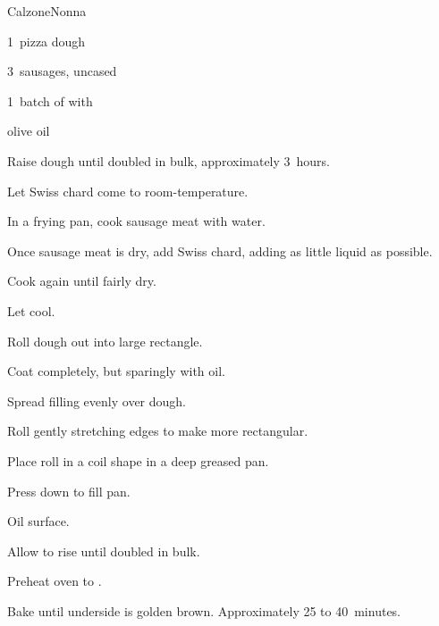 \begin{recipe}{Calzone}{Nonna}{}

\begin{ingredients}
\item 1~pizza dough
\item 3~sausages, uncased
\item 1~batch of  with 
\item olive oil
\end{ingredients}

\begin{directions}
\item Raise dough until doubled in bulk, approximately 3~hours.
\item Let Swiss chard come to room-temperature.
\item In a frying pan, cook sausage meat with \C{\quarter} water.
\item Once sausage meat is dry, add Swiss chard, adding as little liquid as possible.
\item Cook again until fairly dry.
\item Let cool.
\item Roll dough out into large rectangle.
\item Coat completely, but sparingly with oil.
\item Spread filling evenly over dough.
\item Roll gently stretching edges to make more rectangular.
\item Place roll in a coil shape in a deep greased pan.
\item Press down to fill pan.
\item Oil surface.
\item Allow to rise until doubled in bulk.
\item Preheat oven to .
\item Bake until underside is golden brown. Approximately 25 to 40~minutes.
\end{directions}

\end{recipe}

